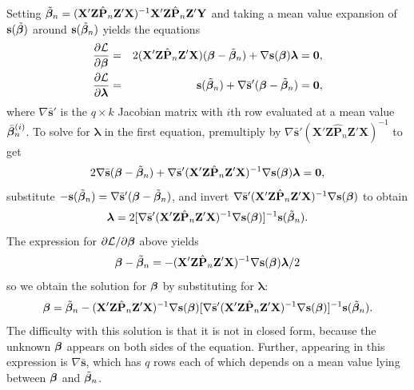 Setting $\tilde{\boldsymbol{\beta}}_n = (\mathbf{X}'\mathbf{Z}\hat{\mathbf{P}}_n\mathbf{Z}'\mathbf{X})^{-1}\mathbf{X}'\mathbf{Z}\hat{\mathbf{P}}_n\mathbf{Z}'\mathbf{Y}$ and taking a mean value expansion of $\mathbf{s}(\tilde{\boldsymbol{\beta}})$ around $\mathbf{s}(\tilde{\boldsymbol{\beta}}_n)$ yields the equations
\begin{eqnarray*}
\frac{\partial \mathcal{L}}{\partial \boldsymbol{\beta}} &=& 2(\mathbf{X}'\mathbf{Z}\hat{\mathbf{P}}_n\mathbf{Z}'\mathbf{X})(\boldsymbol{\beta} - \tilde{\boldsymbol{\beta}}_n) + \nabla \mathbf{s}(\boldsymbol{\beta})\boldsymbol{\lambda} = \mathbf{0},\\
\frac{\partial \mathcal{L}}{\partial \boldsymbol{\lambda}} &=& \mathbf{s}(\tilde{\boldsymbol{\beta}}_n) + \nabla \bar{\mathbf{s}}'(\boldsymbol{\beta} - \tilde{\boldsymbol{\beta}}_n) = \mathbf{0},
\end{eqnarray*}
where $\nabla \bar{\mathbf{s}}'$ is the $q \times k$ Jacobian matrix with $i$th row evaluated at a mean
value $\bar{\boldsymbol{\beta}}_n^{(i)}$. To solve for $\boldsymbol{\lambda}$ in the first equation, premultiply by $\nabla \bar{\mathbf{s}}'(\mathbf{X}'\mathbf{Z}\hat{\mathbf{P}}_n\mathbf{Z}'\mathbf{X})^{-1}$ to get
\[
2\nabla \bar{\mathbf{s}}(\boldsymbol{\beta} - \tilde{\boldsymbol{\beta}}_n) + \nabla \bar{\mathbf{s}}'(\mathbf{X}'\mathbf{Z}\hat{\mathbf{P}}_n\mathbf{Z}'\mathbf{X})^{-1}\nabla \mathbf{s}(\boldsymbol{\beta})\boldsymbol{\lambda} = \mathbf{0},
\]
substitute $-\mathbf{s}(\tilde{\boldsymbol{\beta}}_n) = \nabla \bar{\mathbf{s}}'(\boldsymbol{\beta} - \tilde{\boldsymbol{\beta}}_n)$, and invert $\nabla \bar{\mathbf{s}}'(\mathbf{X}'\mathbf{Z}\hat{\mathbf{P}}_n\mathbf{Z}'\mathbf{X})^{-1}\nabla \mathbf{s}(\boldsymbol{\beta})$ to
obtain
\[
\boldsymbol{\lambda} = 2[\nabla \bar{\mathbf{s}}'(\mathbf{X}'\mathbf{Z}\hat{\mathbf{P}}_n\mathbf{Z}'\mathbf{X})^{-1}\nabla \mathbf{s}(\boldsymbol{\beta})]^{-1}\mathbf{s}(\tilde{\boldsymbol{\beta}}_n).
\]
The expression for $\partial \mathcal{L}/\partial \boldsymbol{\beta}$ above yields
\[
\boldsymbol{\beta} - \tilde{\boldsymbol{\beta}}_n = -(\mathbf{X}'\mathbf{Z}\hat{\mathbf{P}}_n\mathbf{Z}'\mathbf{X})^{-1}\nabla \mathbf{s}(\boldsymbol{\beta})\boldsymbol{\lambda}/2
\]
so we obtain the solution for $\boldsymbol{\beta}$ by substituting for $\boldsymbol{\lambda}$:
\[
\boldsymbol{\beta} = \tilde{\boldsymbol{\beta}}_n - (\mathbf{X}'\mathbf{Z}\hat{\mathbf{P}}_n\mathbf{Z}'\mathbf{X})^{-1}\nabla \mathbf{s}(\boldsymbol{\beta})[\nabla \bar{\mathbf{s}}'(\mathbf{X}'\mathbf{Z}\hat{\mathbf{P}}_n\mathbf{Z}'\mathbf{X})^{-1}\nabla \mathbf{s}(\boldsymbol{\beta})]^{-1}\mathbf{s}(\tilde{\boldsymbol{\beta}}_n).
\]
The difficulty with this solution is that it is not in closed form, because the
unknown $\boldsymbol{\beta}$ appears on both sides of the equation. Further, appearing in
this expression is $\nabla \bar{\mathbf{s}}$, which has $q$ rows each of which depends on a mean
value lying between $\boldsymbol{\beta}$ and $\tilde{\boldsymbol{\beta}}_n$.

